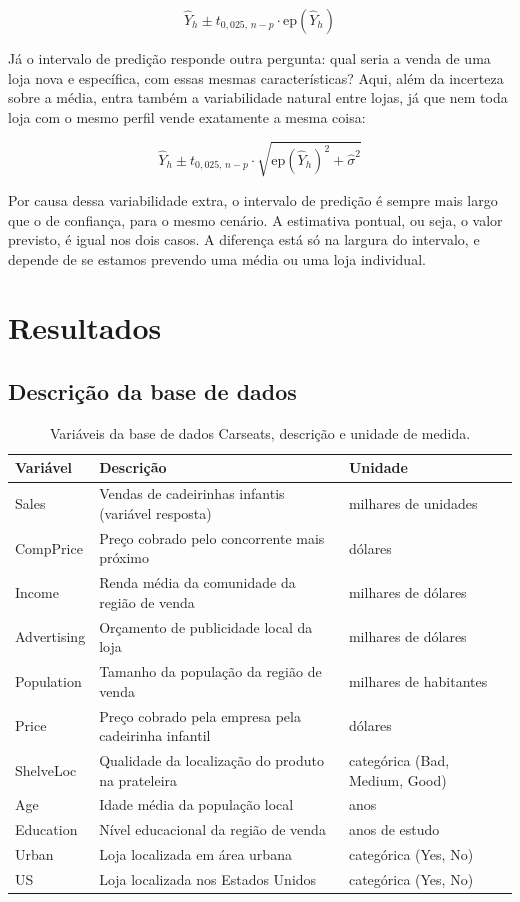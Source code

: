 \documentclass[a4paper]{modeloUFCG} %
\begin{document}
\[
\hat{Y}_h \pm t_{0{,}025,\, n-p} \cdot \text{ep}\!\left(\hat{Y}_h\right)
\]

Já o intervalo de predição responde outra pergunta: qual seria a venda de uma loja nova e específica, com essas mesmas características? Aqui, além da incerteza sobre a média, entra também a variabilidade natural entre lojas, já que nem toda loja com o mesmo perfil vende exatamente a mesma coisa:

\[
\hat{Y}_h \pm t_{0{,}025,\, n-p} \cdot \sqrt{\text{ep}\!\left(\hat{Y}_h\right)^2 + \hat{\sigma}^2}
\]

Por causa dessa variabilidade extra, o intervalo de predição é sempre mais largo que o de confiança, para o mesmo cenário. A estimativa pontual, ou seja, o valor previsto, é igual nos dois casos. A diferença está só na largura do intervalo, e depende de se estamos prevendo uma média ou uma loja individual.

\section{Resultados}\label{resultados}

\subsection{Descrição da base de dados}\label{descriuxe7uxe3o-da-base-de-dados}

\begin{table}

\caption{\label{tab:variaveis}Variáveis da base de dados Carseats, descrição e unidade de medida.}
\centering
\begin{tabular}[t]{l|l|l}
\hline
Variável & Descrição & Unidade\\
\hline
Sales & Vendas de cadeirinhas infantis (variável resposta) & milhares de unidades\\
\hline
CompPrice & Preço cobrado pelo concorrente mais próximo & dólares\\
\hline
Income & Renda média da comunidade da região de venda & milhares de dólares\\
\hline
Advertising & Orçamento de publicidade local da loja & milhares de dólares\\
\hline
Population & Tamanho da população da região de venda & milhares de habitantes\\
\hline
Price & Preço cobrado pela empresa pela cadeirinha infantil & dólares\\
\hline
ShelveLoc & Qualidade da localização do produto na prateleira & categórica (Bad, Medium, Good)\\
\hline
Age & Idade média da população local & anos\\
\hline
Education & Nível educacional da região de venda & anos de estudo\\
\hline
Urban & Loja localizada em área urbana & categórica (Yes, No)\\
\hline
US & Loja localizada nos Estados Unidos & categórica (Yes, No)\\
\hline
\end{tabular}
\end{table}
\end{document}
